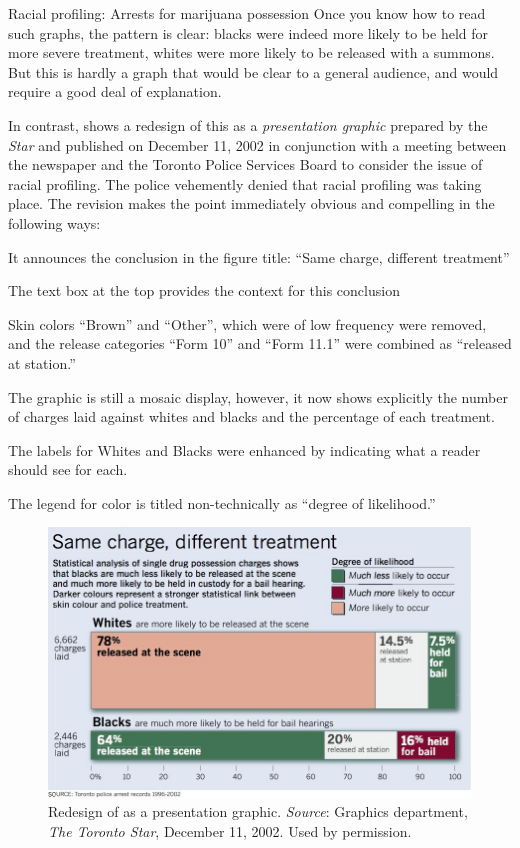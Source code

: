 \documentclass[10pt,krantz2]{krantz}\usepackage[]{graphicx}\usepackage[]{color}
\begin{document}
\begin{Example}[arrests0]{Racial profiling: Arrests for marijuana possession}
Once you know how to read such graphs, the pattern is clear: blacks were indeed more likely
to be held for more severe treatment, whites were more likely to be released with a
summons.  But this is hardly a graph that would be clear to a general audience,
and would require a good deal of explanation.

In contrast,  shows a redesign of this as a \emph{presentation graphic}
prepared by the \emph{Star} and published on December 11, 2002
in conjunction with a meeting between the newspaper and the Toronto Police Services Board
to consider the issue of racial profiling.  The police vehemently denied that racial profiling
was taking place.  The revision makes the point immediately obvious and compelling in the
following ways:
\begin{itemize*}
 \item It announces the conclusion in the figure title: ``Same charge, different treatment''
 \item The text box at the top provides the context for this conclusion
 \item Skin colors ``Brown'' and ``Other'', which were of low frequency were removed,
 and the release categories ``Form 10'' and ``Form 11.1'' were combined as ``released at station.''
 \item The graphic is still a mosaic display, however, it now shows explicitly the number
 of charges laid against whites and blacks and the percentage of each treatment.
 \item The labels for Whites and Blacks were enhanced by indicating what a reader should see for each.
 \item The legend for color is titled non-technically as ``degree of likelihood.''
\end{itemize*}

\begin{figure}[htb]
\centering
\includegraphics[width=.9\textwidth]{ch01/fig/TorStar/TorontoStar-graphic-2002-12-11-2}
\caption{Redesign of  as a presentation graphic. \emph{Source}: Graphics department, \emph{The Toronto Star}, December 11, 2002. Used by permission.}\label{fig:arrests0-star}
\end{figure}


\end{Example}
\end{document}
